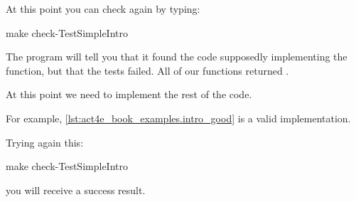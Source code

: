 

At this point you can check again by typing:

\begin{console}
    make check-TestSimpleIntro
\end{console}

The program will tell you that it found the code supposedly implementing the function, but that the tests failed.
All of our functions returned .

At this point we need to implement the rest of the code.

For example, \cref{lst:act4e_book_examples.intro_good} is a valid implementation.

\begin{longcode}
    \caption{}
    \label{lst:act4e_book_examples.intro_good}
\end{longcode}

Trying again this:

\begin{console}
    make check-TestSimpleIntro
\end{console}

you will receive a success result.


